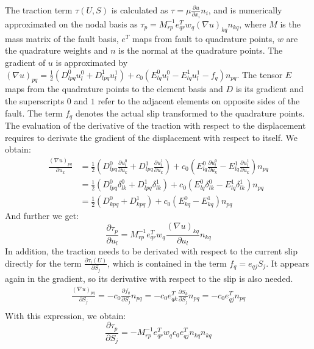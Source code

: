 The traction term $\tau(U,S)$ is calculated as $\tau = \mu \frac{\partial u}{\partial x_i}n_i$, and is numerically approximated on the nodal basis as $\tau_p = M_{rp}^{-1}e_{qr}^Tw_q(\nabla u)_{kq}n_{kq}$, where $M$ is the mass matrix of the fault basis, $e^T$ maps from fault to quadrature points, $w$ are the quadrature weights and $n$ is the normal at the quadrature points. The gradient of $u$ is approximated by $(\nabla u)_{pq} = \frac{1}{2}\left(D_{lpq}^0u_l^0 + D_{lpq}^1u_l^1\right) + c_0\left(E_{lq}^0u_l^0 - E_{lq}^1u_l^1 - f_q\right)n_{pq}$. The tensor $E$ maps from the quadrature points to the element basis and $D$ is its gradient and the superscripts $0$ and $1$ refer to the adjacent elements on opposite sides of the fault. The term $f_q$ denotes the actual slip transformed to the quadrature points. The evaluation of the derivative of the traction with respect to the displacement requires to derivate the gradient of the displacement with respect to itself. We obtain: 
\begin{align}
\frac{(\nabla u)_{pq}}{\partial u_k} &= \frac{1}{2}\left(D_{lpq}^0\frac{\partial u_l^0}{\partial u_k} + D_{lpq}^1\frac{\partial u_l^1}{\partial u_k}\right) + c_0\left(E_{lq}^0\frac{\partial u_l^0}{\partial u_k} - E_{lq}^1\frac{\partial u_l^1}{\partial u_k}\right)n_{pq} \\
&= \frac{1}{2}\left(D_{lpq}^0\delta_{lk}^0 + D_{lpq}^1\delta_{lk}^1\right) + c_0\left(E_{lq}^0\delta_{lk}^0 - E_{lq}^1\delta_{lk}^1\right)n_{pq} \\
&= \frac{1}{2}\left(D_{kpq}^0 + D_{kpq}^1\right) + c_0\left(E_{kq}^0 - E_{kq}^1\right)n_{pq} 
\end{align}
And further we get: 
\begin{equation}
\frac{\partial \tau_p}{\partial u_l} = M_{rp}^{-1}e_{qr}^Tw_q
\frac{(\nabla u)_{kq}}{\partial u_l}n_{kq}
\end{equation}
In addition, the traction needs to be derivated with respect to the current slip directly for the term $\frac{\partial \tau_i(U)}{\partial S_j}$, which is contained in the term $f_q = e_{qj}S_j$. It appears again in the gradient, so its derivative with respect to the slip is also needed. 
\begin{align}
\frac{(\nabla u)_{pq}}{\partial S_j} = -c_0 \frac{\partial f_q}{\partial S_j}n_{pq} 
= -c_0 e^T_{qk}\frac{\partial S_k}{\partial S_j}n_{pq} 
= -c_0 e^T_{qj}n_{pq} \\	
\end{align}
With this expression, we obtain: 
\begin{equation}
\label{eq:JacobianDtauDS_Poisson}
\frac{\partial \tau_p}{\partial S_j} = -M_{rp}^{-1}e_{qr}^Tw_qc_0e^T_{qj}n_{kq}n_{kq}
\end{equation}
